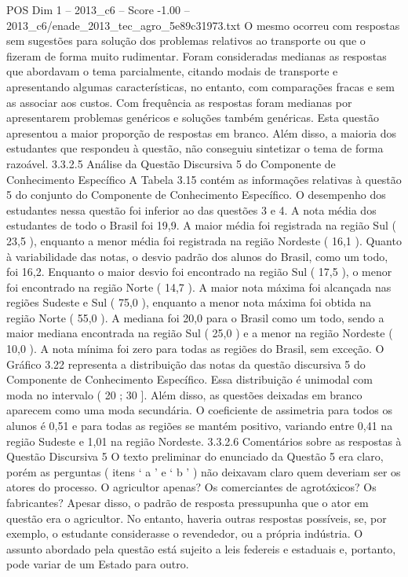 \begin{textsample}{POS Dim 1 – 2013\_c6 – Score -1.00 – 2013\_c6/enade\_2013\_tec\_agro\_5e89c31973.txt}
O mesmo ocorreu com respostas sem sugestões para solução dos problemas relativos ao transporte ou que o fizeram de forma muito rudimentar.
Foram consideradas medianas as respostas que abordavam o tema parcialmente, citando modais de transporte e apresentando algumas características, no entanto, com comparações fracas e sem as associar aos custos.
Com frequência as respostas foram medianas por apresentarem problemas genéricos e soluções também genéricas.
Esta questão apresentou a maior proporção de respostas em branco.
Além disso, a maioria dos estudantes que respondeu à questão, não conseguiu sintetizar o tema de forma razoável. 3.3.2.5 Análise da Questão Discursiva 5 do Componente de Conhecimento Específico A Tabela 3.15 contém as informações relativas à questão 5 do conjunto do Componente de Conhecimento Específico.
O desempenho dos estudantes nessa questão foi inferior ao das questões 3 e 4.
A nota média dos estudantes de todo o Brasil foi 19,9.
A maior média foi registrada na região Sul ( 23,5 ), enquanto a menor média foi registrada na região Nordeste ( 16,1 ).
Quanto à variabilidade das notas, o desvio padrão dos alunos do Brasil, como um todo, foi 16,2.
Enquanto o maior desvio foi encontrado na região Sul ( 17,5 ), o menor foi encontrado na região Norte ( 14,7 ).
A maior nota máxima foi alcançada nas regiões Sudeste e Sul ( 75,0 ), enquanto a menor nota máxima foi obtida na região Norte ( 55,0 ).
A mediana foi 20,0 para o Brasil como um todo, sendo a maior mediana encontrada na região Sul ( 25,0 ) e a menor na região Nordeste ( 10,0 ).
A nota mínima foi zero para todas as regiões do Brasil, sem exceção.
O Gráfico 3.22 representa a distribuição das notas da questão discursiva 5 do Componente de Conhecimento Específico.
Essa distribuição é unimodal com moda no intervalo ( 20 ; 30 ].
Além disso, as questões deixadas em branco aparecem como uma moda secundária.
O coeficiente de assimetria para todos os alunos é 0,51 e para todas as regiões se mantém positivo, variando entre 0,41 na região Sudeste e 1,01 na região Nordeste. 3.3.2.6 Comentários sobre as respostas à Questão Discursiva 5 O texto preliminar do enunciado da Questão 5 era claro, porém as perguntas ( itens ‘ a ’ e ‘ b ’ ) não deixavam claro quem deveriam ser os atores do processo.
O agricultor apenas?
Os comerciantes de agrotóxicos?
Os fabricantes?
Apesar disso, o padrão de resposta pressupunha que o ator em questão era o agricultor.
No entanto, haveria outras respostas possíveis, se, por exemplo, o estudante considerasse o revendedor, ou a própria indústria.
O assunto abordado pela questão está sujeito a leis federeis e estaduais e, portanto, pode variar de um Estado para outro.

\end{textsample}
